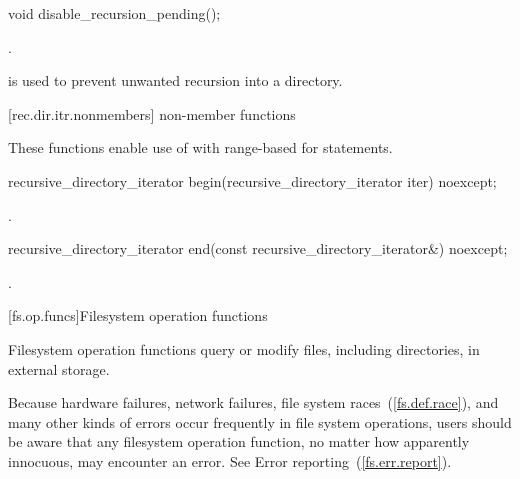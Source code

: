 %
\begin{itemdecl}
void disable_recursion_pending();
\end{itemdecl}

\begin{itemdescr}
\pnum
\postconditions {}.

\pnum
\begin{note} \tcode{()} is used to prevent
  unwanted recursion into a directory. \end{note}
\end{itemdescr}

[rec.dir.itr.nonmembers]{ non-member functions}

\pnum
These functions enable use of 
with range-based for statements.

%
\begin{itemdecl}
recursive_directory_iterator begin(recursive_directory_iterator iter) noexcept;
\end{itemdecl}

\begin{itemdescr}
\pnum
\returns {}.
\end{itemdescr}

%
\begin{itemdecl}
recursive_directory_iterator end(const recursive_directory_iterator&) noexcept;
\end{itemdecl}

\begin{itemdescr}
\pnum
\returns {}.
\end{itemdescr}

[fs.op.funcs]{Filesystem operation functions}

\pnum
Filesystem operation functions query or modify files, including directories,
in external storage.

\pnum
\begin{note} Because hardware failures, network failures, file system races~(\ref{fs.def.race}),
and many other kinds of errors occur frequently in file system operations, users should be aware
that any filesystem operation function, no matter how apparently innocuous, may encounter
an error. See Error reporting~(\ref{fs.err.report}). \end{note}


